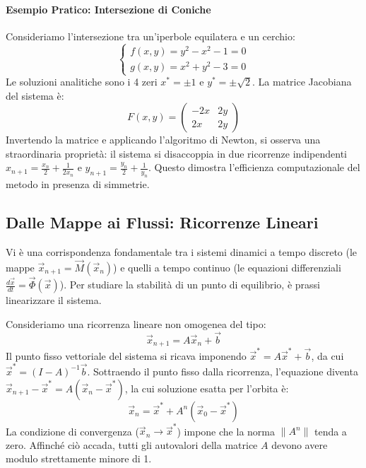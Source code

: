 \documentclass[12pt,a4paper]{article}
\begin{document}
\paragraph{Esempio Pratico: Intersezione di Coniche}
Consideriamo l'intersezione tra un'iperbole equilatera e un cerchio:
\begin{equation}
\begin{cases}
f(x, y) = y^2 - x^2 - 1 = 0 \\
g(x, y) = x^2 + y^2 - 3 = 0
\end{cases}
\end{equation}
Le soluzioni analitiche sono i 4 zeri $x^* = \pm 1$ e $y^* = \pm \sqrt{2}$. La matrice Jacobiana del sistema è:
\begin{equation}
F(x, y) = \begin{pmatrix} -2x & 2y \\ 2x & 2y \end{pmatrix}
\end{equation}
Invertendo la matrice e applicando l'algoritmo di Newton, si osserva una straordinaria proprietà: il sistema si disaccoppia in due ricorrenze indipendenti $x_{n+1} = \frac{x_n}{2} + \frac{1}{2x_n}$ e $y_{n+1} = \frac{y_n}{2} + \frac{1}{y_n}$. Questo dimostra l'efficienza computazionale del metodo in presenza di simmetrie.

\subsection{Dalle Mappe ai Flussi: Ricorrenze Lineari}
Vi è una corrispondenza fondamentale tra i sistemi dinamici a tempo discreto (le mappe $\vec{x}_{n+1} = \vec{M}(\vec{x}_n)$) e quelli a tempo continuo (le equazioni differenziali $\frac{d\vec{x}}{dt} = \vec{\Phi}(\vec{x})$). Per studiare la stabilità di un punto di equilibrio, è prassi linearizzare il sistema.

Consideriamo una ricorrenza lineare non omogenea del tipo:
\begin{equation}
\vec{x}_{n+1} = A\vec{x}_n + \vec{b}
\end{equation}
Il punto fisso vettoriale del sistema si ricava imponendo $\vec{x}^* = A\vec{x}^* + \vec{b}$, da cui $\vec{x}^* = (I - A)^{-1}\vec{b}$. Sottraendo il punto fisso dalla ricorrenza, l'equazione diventa $\vec{x}_{n+1} - \vec{x}^* = A(\vec{x}_n - \vec{x}^*)$, la cui soluzione esatta per l'orbita è:
\begin{equation}
\vec{x}_n = \vec{x}^* + A^n(\vec{x}_0 - \vec{x}^*)
\end{equation}
La condizione di convergenza ($\vec{x}_n \to \vec{x}^*$) impone che la norma $\|A^n\|$ tenda a zero. Affinché ciò accada, tutti gli autovalori della matrice $A$ devono avere modulo strettamente minore di 1.
\end{document}
